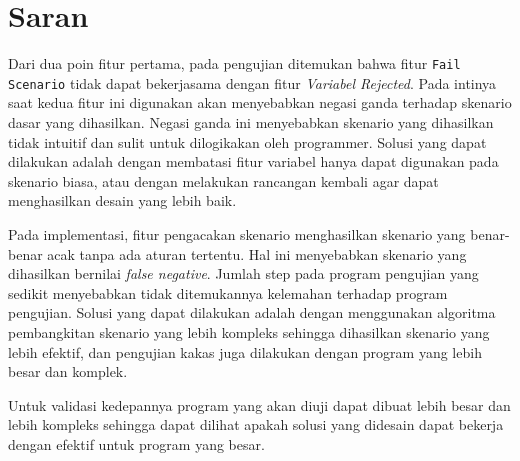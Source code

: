 \section{Saran}

Dari dua poin fitur pertama, pada pengujian ditemukan bahwa fitur \texttt{Fail Scenario} tidak dapat bekerjasama dengan fitur
\textit{Variabel Rejected}. Pada intinya saat kedua fitur ini digunakan akan menyebabkan negasi ganda terhadap skenario
dasar yang dihasilkan. Negasi ganda ini menyebabkan skenario yang dihasilkan tidak intuitif dan sulit untuk dilogikakan
oleh programmer. Solusi yang dapat dilakukan adalah dengan membatasi fitur variabel hanya dapat digunakan pada skenario
biasa, atau dengan melakukan rancangan kembali agar dapat menghasilkan desain yang lebih baik.

Pada implementasi, fitur pengacakan skenario menghasilkan skenario yang benar-benar acak tanpa ada aturan tertentu.
Hal ini menyebabkan skenario yang dihasilkan bernilai \textit{false negative}. Jumlah step pada program pengujian
yang sedikit menyebabkan tidak ditemukannya kelemahan terhadap program pengujian. Solusi yang dapat dilakukan
adalah dengan menggunakan algoritma pembangkitan skenario yang lebih kompleks sehingga dihasilkan skenario yang lebih efektif,
dan pengujian kakas juga dilakukan dengan program yang lebih besar dan komplek.

Untuk validasi kedepannya program yang akan diuji dapat dibuat lebih besar dan lebih kompleks sehingga dapat dilihat apakah
solusi yang didesain dapat bekerja dengan efektif untuk program yang besar.